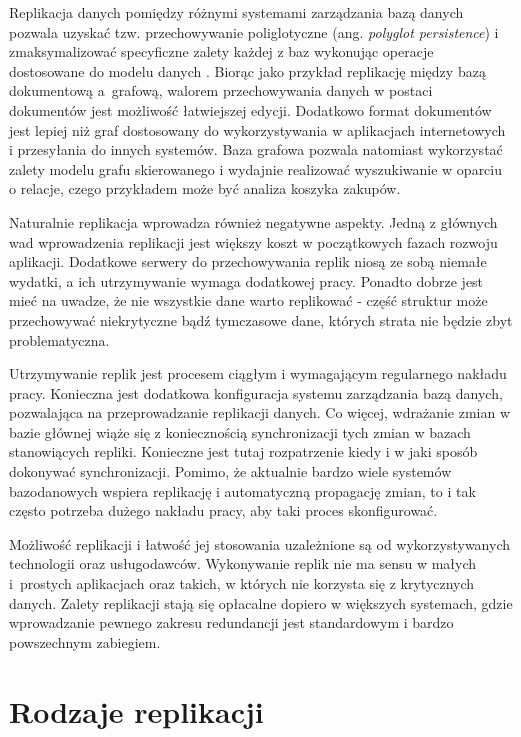 \documentclass[a4paper,twoside,12pt]{book}
\newcommand{\obcy}[1]{\emph{#1}}
\newcommand{\ang}[1]{{\selectlanguage{british}\obcy{#1}}}
\begin{document}
Replikacja danych pomiędzy różnymi systemami zarządzania bazą danych pozwala uzyskać tzw. przechowywanie poliglotyczne (ang. \ang{polyglot persistence}) i zmaksymalizować specyficzne zalety każdej z baz wykonując operacje dostosowane do modelu danych \cite{bib:fowler-polyglot-persistence}. Biorąc jako przykład replikację między bazą dokumentową a~grafową, walorem przechowywania danych w postaci dokumentów jest możliwość łatwiejszej edycji. Dodatkowo format dokumentów jest lepiej niż graf dostosowany do wykorzystywania w aplikacjach internetowych i przesyłania do innych systemów. Baza grafowa pozwala natomiast wykorzystać zalety modelu grafu skierowanego i wydajnie realizować wyszukiwanie w oparciu o relacje, czego przykładem może być analiza koszyka zakupów. 

Naturalnie replikacja wprowadza również negatywne aspekty. Jedną z głównych wad wprowadzenia replikacji jest większy koszt w początkowych fazach rozwoju aplikacji. Dodatkowe serwery do przechowywania replik niosą ze sobą niemałe wydatki, a ich utrzymywanie wymaga dodatkowej pracy. Ponadto dobrze jest mieć na uwadze, że nie wszystkie dane warto replikować - część struktur może przechowywać niekrytyczne bądź tymczasowe dane, których strata nie będzie zbyt problematyczna.

Utrzymywanie replik jest procesem ciągłym i wymagającym regularnego nakładu pracy. Konieczna jest dodatkowa konfiguracja systemu zarządzania bazą danych, pozwalająca na przeprowadzanie replikacji danych. Co więcej, wdrażanie zmian w bazie głównej wiąże się z koniecznością synchronizacji tych zmian w bazach stanowiących repliki. Konieczne jest tutaj rozpatrzenie kiedy i w jaki sposób dokonywać synchronizacji. Pomimo, że aktualnie bardzo wiele systemów bazodanowych wspiera replikację i automatyczną propagację zmian, to i tak często potrzeba dużego nakładu pracy, aby taki proces skonfigurować.

Możliwość replikacji i łatwość jej stosowania uzależnione są od wykorzystywanych technologii oraz usługodawców. Wykonywanie replik nie ma sensu w małych i~prostych aplikacjach oraz takich, w których nie korzysta się z krytycznych danych. Zalety replikacji stają się opłacalne dopiero w większych systemach, gdzie wprowadzanie pewnego zakresu redundancji jest standardowym i bardzo powszechnym zabiegiem.

\section{Rodzaje replikacji}
\end{document}
